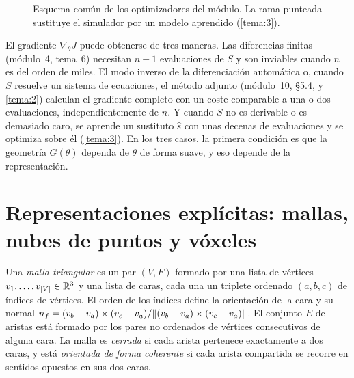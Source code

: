 \begin{figure}[h]
\centering
{}
\caption{Esquema común de los optimizadores del módulo. La rama punteada sustituye el simulador por un modelo aprendido (\cref{tema:3}).}
\label{fig:cadena}
\end{figure}

El gradiente $\nabla_\theta J$ puede obtenerse de tres maneras. Las diferencias finitas (módulo~4, tema~6) necesitan $n+1$ evaluaciones de $S$ y son inviables cuando $n$ es del orden de miles. El modo inverso de la diferenciación automática o, cuando $S$ resuelve un sistema de ecuaciones, el método adjunto (módulo~10, §5.4, y \cref{tema:2}) calculan el gradiente completo con un coste comparable a una o dos evaluaciones, independientemente de $n$. Y cuando $S$ no es derivable o es demasiado caro, se aprende un sustituto $\hat s$ con unas decenas de evaluaciones y se optimiza sobre él (\cref{tema:3}). En los tres casos, la primera condición es que la geometría $G(\theta)$ dependa de $\theta$ de forma suave, y eso depende de la representación.

\section{Representaciones explícitas: mallas, nubes de puntos y vóxeles}

\begin{definicion}\label{def:malla}
Una \emph{malla triangular} es un par $(V,F)$ formado por una lista de vértices $v_1,\dots,v_{\lvert V\rvert}\in\mathbb{R}^3$ y una lista de caras, cada una un triplete ordenado $(a,b,c)$ de índices de vértices. El orden de los índices define la orientación de la cara y su normal $n_f=(v_b-v_a)\times(v_c-v_a)/\lVert(v_b-v_a)\times(v_c-v_a)\rVert$. El conjunto $E$ de aristas está formado por los pares no ordenados de vértices consecutivos de alguna cara. La malla es \emph{cerrada} si cada arista pertenece exactamente a dos caras, y está \emph{orientada de forma coherente} si cada arista compartida se recorre en sentidos opuestos en sus dos caras.
\end{definicion}

